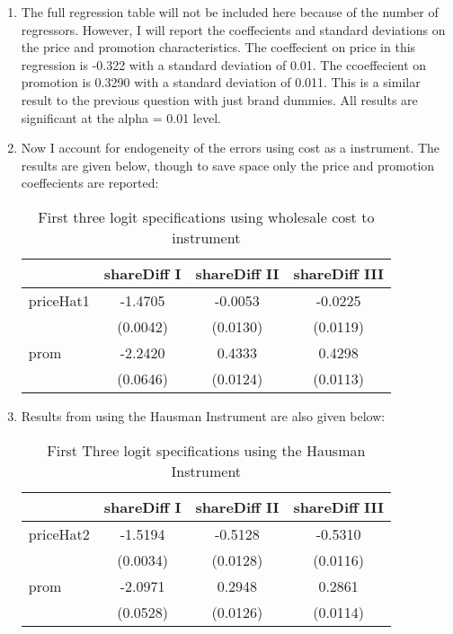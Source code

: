 \documentclass[10pt]{article}
\begin{document}
\begin{enumerate}
  \item The full regression table will not be included here because of the number of regressors. However, I will report the coeffecients and standard deviations on the price and promotion characteristics. The coeffecient on price in this regression is -0.322 with a standard deviation of 0.01. The ccoeffecient on promotion is 0.3290 with a standard deviation of 0.011. This is a similar result to the previous question with just brand dummies. All results are significant at the alpha = 0.01 level.

  \item Now I account for endogeneity of the errors using cost as a instrument. The results are given below, though to save space only the price and promotion coeffecients are reported:

  \begin{table}[!htb]
  \caption{First three logit specifications using wholesale cost to instrument}
  \begin{center}
  \begin{tabular}{lccc}
  \hline
            & shareDiff I & shareDiff II & shareDiff III  \\
  \hline
  priceHat1 & -1.4705     & -0.0053      & -0.0225        \\
            & (0.0042)    & (0.0130)     & (0.0119)       \\
  prom      & -2.2420     & 0.4333       & 0.4298         \\
            & (0.0646)    & (0.0124)     & (0.0113)       \\
  \hline
  \end{tabular}
  \end{center}
  \end{table}

  \item Results from using the Hausman Instrument are also given below:

  \begin{table}[!htb]
  \caption{First Three logit specifications using the Hausman Instrument}
  \begin{center}

  \begin{tabular}{lccc}
  \hline
            & shareDiff I & shareDiff II & shareDiff III  \\
  \hline
  priceHat2 & -1.5194     & -0.5128      & -0.5310        \\
          & (0.0034)    & (0.0128)     & (0.0116)       \\
  prom      & -2.0971     & 0.2948       & 0.2861         \\
          & (0.0528)    & (0.0126)     & (0.0114)       \\
  \hline
  \end{tabular}
  \end{center}
  \end{table}


\end{enumerate}
\end{document}
